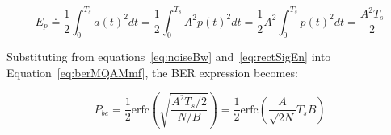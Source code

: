 \begin{refsection}
\begin{equation}\label{eq:rectSigEn}
E_p \doteq \frac{1}{2}\int_{0}^{T_s} a(t)^2 dt = \frac{1}{2}\int_{0}^{T_s} A^2 p(t)^2 dt=\frac{1}{2} A^2 \int_{0}^{T_s} p(t)^2 dt= \frac{A^2 T_s}{2}
\end{equation}

Substituting from equations~\ref{eq:noiseBw} and~\ref{eq:rectSigEn} into Equation~\ref{eq:berMQAMmf}, the BER expression becomes:

\begin{equation}\label{eq:berMod}
P_{be} = \frac{1}{2} \text{erfc}\left(\sqrt{\frac{A^2 T_s / 2}{ N / B}}\right) = 
\frac{1}{2} \text{erfc}\left(\frac{A}{\sqrt{2N}} {{T_s}{B}}\right) 
\end{equation}


%



%
%


\end{refsection}
